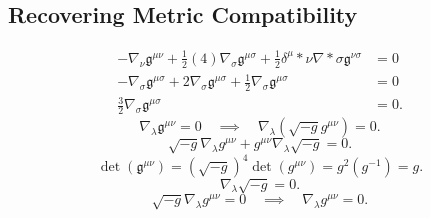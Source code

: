\documentclass[11pt, a4paper]{report}
\begin{document}
\subsection{Recovering Metric Compatibility}
\begin{align}
-\nabla_{\nu}\mathfrak{g}^{\mu\nu} + \frac{1}{2}(4) \nabla_{\sigma}\mathfrak{g}^{\mu\sigma} + \frac{1}{2}\delta^{\mu}*{\nu} \nabla*{\sigma}\mathfrak{g}^{\nu\sigma} &= 0 \nonumber \\
-\nabla_{\sigma}\mathfrak{g}^{\mu\sigma} + 2 \nabla_{\sigma}\mathfrak{g}^{\mu\sigma} + \frac{1}{2}\nabla_{\sigma}\mathfrak{g}^{\mu\sigma} &= 0 \nonumber \\
\frac{3}{2} \nabla_{\sigma}\mathfrak{g}^{\mu\sigma} &= 0.
\end{align}
\begin{equation}
\nabla_{\lambda}\mathfrak{g}^{\mu\nu} = 0 \quad \implies \quad \nabla_{\lambda}(\sqrt{-g}g^{\mu\nu}) = 0.
\end{equation}
\begin{equation}
\label{eq:density_product_rule}
\sqrt{-g}\nabla_{\lambda}g^{\mu\nu} + g^{\mu\nu}\nabla_{\lambda}\sqrt{-g} = 0.
\end{equation}
\begin{equation}
\det(\mathfrak{g}^{\mu\nu}) = (\sqrt{-g})^{4} \det(g^{\mu\nu}) = g^{2} (g^{-1}) = g.
\end{equation}
\begin{equation}
\nabla_{\lambda}\sqrt{-g} = 0.
\end{equation}
\begin{equation}
\sqrt{-g} \nabla_{\lambda}g^{\mu\nu} = 0 \quad \implies \quad \nabla_{\lambda}g^{\mu\nu} = 0.
\end{equation}
\end{document}
